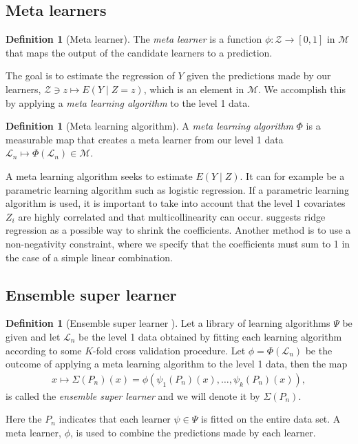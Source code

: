 \documentclass[11pt, a4paper]{article}
\theoremstyle{definition}
\newtheorem{definition}[theorem]{Definition}
\theoremstyle{remark}
\newcommand{\la}{\psi}
\newcommand{\lib}{\Psi}
\newcommand{\lone}{\mathcal{L}}
\newcommand{\meta}{\phi}
\newcommand{\Meta}{\Phi}
\newcommand{\esl}{\Sigma}
\begin{document}
\subsection{Meta learners}
\begin{definition}[Meta learner]
    The \textit{meta learner} is a function $ \meta: \mathcal{Z} \to [0,1] $ in $ \mathcal{M} $ that maps the output of the candidate learners to a prediction. 
\end{definition}
The goal is to estimate the regression of $ Y $ given the predictions made by our learners, $ \mathcal{Z} \ni z \mapsto E(Y \mid Z = z) $, which is an element in $ \mathcal{M} $. We accomplish this by applying a \textit{meta learning algorithm} to the level 1 data. 
\begin{definition}[Meta learning algorithm]
    A \textit{meta learning algorithm} $ \Meta $ is a measurable map that creates a meta learner from our level 1 data $ \lone_{n} \mapsto \Meta(\lone_{n}) \in \mathcal{M} $. 
\end{definition}
A meta learning algorithm seeks to estimate $ E (Y \mid Z) $. It can for example be a parametric learning algorithm such as logistic regression. If a parametric learning algorithm is used, it is important to take into account that the level 1 covariates $ Z_i $ are highly correlated and that multicollinearity can occur. \cite{breiman1996stacked} suggests ridge regression as a possible way to shrink the coefficients. Another method is to use a non-negativity constraint, where we specify that the coefficients must sum to 1 in the case of a simple linear combination. 

\subsection{Ensemble super learner}
\begin{definition}[Ensemble super learner \parencite{van2007super}]
    Let a library of learning algorithms $ \lib $ be given and let $ \lone_{n} $ be the level 1 data obtained by fitting each learning algorithm according to some $ K $-fold cross validation procedure. Let $ \meta = \Meta(\lone_{n}) $ be the outcome of applying a meta learning algorithm to the level 1 data, then the map 
    \begin{align*}
       x \mapsto \esl(P_n)(x) = \meta(\la_1(P_{n})(x), \ldots, \la_k(P_{n})(x) ),
    \end{align*}
    is called the \textit{ensemble super learner} and we will denote it by $ \esl(P_{n}) $. 
\end{definition}
Here the $ P_n $ indicates that each learner $ \la \in \lib $ is fitted on the entire data set. A meta learner, $ \meta $, is used to combine the predictions made by each learner. 
\end{document}
